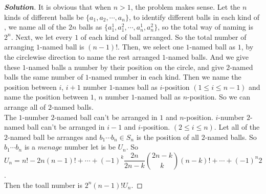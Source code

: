 \documentclass{ctexart}
\newcounter{problem}
\newenvironment{solution}{\begin{proof}[\textbf{Solution}]}{\end{proof}}
\renewcommand{\(}{\left(}
\renewcommand{\)}{\right)}
\newcommand{\Cb}[2]{\binom{#1}{#2}}
\newcommand{\minus}{\mathbin{\backslash}}
\begin{document}
\begin{solution}
	It is obvious that when $n> 1$, the problem makes sense.
	Let the  $n$ kinds of different balls be $\{a_1,a_2,\cdots,a_n\}$, to identify different balls in each kind of , we name all of the $2n$ balls as $\{a_1^1,a_1^2,\cdots,a_n^1,a_n^2\}$, so the total way of naming is $2^n$. Next, we let every $1$ of each kind of ball arranged. So the total number of arranging $1$-named ball is $(n-1)!$. Then, we select one $1$-named ball as $1$, by the circlewise direction to name the rest arranged $1$-named balls. And we give these $1$-named balls a number by their position on the circle, and give $2$-named balls the same number of $1$-named number in each kind. Then we name the position between $i$, $i+1$ number $1$-names ball as $i$-position $(1\leq i\leq n-1)$ and name the position between $1$, $n$ number $1$-named ball as $n$-position. So we can arrange all of $2$-named balls. \\
	The $1$-number $2$-named ball can't be arranged in $1$ and $n$-position. $i$-number $2$-named ball can't be arranged in $i-1$ and $i$-position. $(2\leq i\leq n)$. Let all of the $2$-named ball be arranges and $b_1\cdots b_n\in S_n$ is the position of all $2$-named balls. So $b_1\cdots b_n$ is a $menage$ number let is be $U_n$. So $$U_n=n!-2n(n-1)!+\cdots+(-1)^k\frac{2n}{2n-k}\Cb{2n-k}{k}(n-k)!+\cdots+(-1)^n2$$. \\
	Then the toall number is $2^n(n-1)!U_n$.
	
	\iffalse
	then the different arrangement of $2n$ balls equal to the circle arrangement of set $\{2\cdot a_1, \cdots, 2\cdot a_n\}$. 
	$A:=\{$ all of the circle arrangement of $\{2\cdot a_1, \cdots, 2\cdot a_n\}$ $\}$. $\forall 1\leq l\leq n$, $\forall i_1,\cdots, i_l\in \{1,\cdots, n\}$, $A_{i_1,i_2,\cdots,i_l}:=$ $ \{$ all of the circle arrangement of $\{2\cdot a_1, \cdots, 2\cdot a_n\}$ that appears $a_ka_k, k\in\{i_1,\cdots, i_l\}\}$. $A_{i_1,i_2,\cdots,i_l}$ equals to the circle arrangement of $\{a_{i_1},\cdots  ,a_{i_l}, 2\cdot a_j, 1\leq j\leq n, j\notin \{i_1,i_2,\cdots,i_l\} \}$.\\
	By caculating, $|A|=\frac{1}{2n}\frac{2n!}{(2!)^n}$, $|A_{i_1,i_2,\cdots,i_l}|=\frac{1}{l+2(n-l)}\frac{(l+2(n-l))!}{2!^{n-l}}$. So by the Inclusion-Exclusion Principle, we get $|A\minus\cup_{k=1}^n A_k|=|\{$ all of the circle arrangement of $\{2\cdot a_1, \cdots, 2\cdots a_n\}$ that does't appear $a_ka_k,k=1,\cdots,n\}|$ $=|A|+\sum_{l=1}^n\sum_{1\leq i_1<\cdots <i_l\leq n}(-1)^l|A_{i_1,i_2,\cdots,i_l}|=\frac{1}{2n}\frac{2n!}{(2!)^n}+\sum_{l=1}^n(-1)^l\Cb{n}{l}\frac{1}{l+2(n-l)}\frac{(l+2(n-l))!}{2!^{n-l}}=\frac{(2n-1)!}{(2!)^n}+\sum_{l=1}^n(-1)^l\Cb{n}{l}\frac{(2n-l-1)!}{2!^{n-l}}$.\fi
\end{solution}
\end{document}
